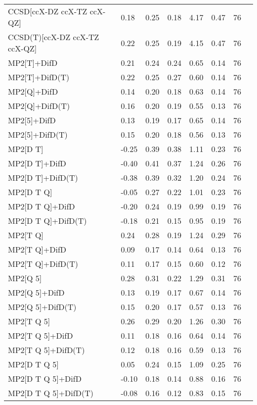 \begin{table}
\begin{tabular}{l l l l l l l l }
    CCSD[ccX-DZ ccX-TZ ccX-QZ] & 0.18 & 0.25 & 0.18 & 4.17 & 0.47 & 76 \\ 
    CCSD(T)[ccX-DZ ccX-TZ ccX-QZ] & 0.22 & 0.25 & 0.19 & 4.15 & 0.47 & 76 \\ 
    MP2[T]+DifD & 0.21 & 0.24 & 0.24 & 0.65 & 0.14 & 76 \\ 
    MP2[T]+DifD(T) & 0.22 & 0.25 & 0.27 & 0.60 & 0.14 & 76 \\ 
    MP2[Q]+DifD & 0.14 & 0.20 & 0.18 & 0.63 & 0.14 & 76 \\ 
    MP2[Q]+DifD(T) & 0.16 & 0.20 & 0.19 & 0.55 & 0.13 & 76 \\ 
    MP2[5]+DifD & 0.13 & 0.19 & 0.17 & 0.65 & 0.14 & 76 \\ 
    MP2[5]+DifD(T) & 0.15 & 0.20 & 0.18 & 0.56 & 0.13 & 76 \\ 
    MP2[D T] & -0.25 & 0.39 & 0.38 & 1.11 & 0.23 & 76 \\ 
    MP2[D T]+DifD & -0.40 & 0.41 & 0.37 & 1.24 & 0.26 & 76 \\ 
    MP2[D T]+DifD(T) & -0.38 & 0.39 & 0.32 & 1.20 & 0.24 & 76 \\ 
    MP2[D T Q] & -0.05 & 0.27 & 0.22 & 1.01 & 0.23 & 76 \\ 
    MP2[D T Q]+DifD & -0.20 & 0.24 & 0.19 & 0.99 & 0.19 & 76 \\ 
    MP2[D T Q]+DifD(T) & -0.18 & 0.21 & 0.15 & 0.95 & 0.19 & 76 \\ 
    MP2[T Q] & 0.24 & 0.28 & 0.19 & 1.24 & 0.29 & 76 \\ 
    MP2[T Q]+DifD & 0.09 & 0.17 & 0.14 & 0.64 & 0.13 & 76 \\ 
    MP2[T Q]+DifD(T) & 0.11 & 0.17 & 0.15 & 0.60 & 0.12 & 76 \\ 
    MP2[Q 5] & 0.28 & 0.31 & 0.22 & 1.29 & 0.31 & 76 \\ 
    MP2[Q 5]+DifD & 0.13 & 0.19 & 0.17 & 0.67 & 0.14 & 76 \\ 
    MP2[Q 5]+DifD(T) & 0.15 & 0.20 & 0.17 & 0.57 & 0.13 & 76 \\ 
    MP2[T Q 5] & 0.26 & 0.29 & 0.20 & 1.26 & 0.30 & 76 \\ 
    MP2[T Q 5]+DifD & 0.11 & 0.18 & 0.16 & 0.64 & 0.14 & 76 \\ 
    MP2[T Q 5]+DifD(T) & 0.12 & 0.18 & 0.16 & 0.59 & 0.13 & 76 \\ 
    MP2[D T Q 5] & 0.05 & 0.24 & 0.15 & 1.09 & 0.25 & 76 \\ 
    MP2[D T Q 5]+DifD & -0.10 & 0.18 & 0.14 & 0.88 & 0.16 & 76 \\ 
    MP2[D T Q 5]+DifD(T) & -0.08 & 0.16 & 0.12 & 0.83 & 0.15 & 76 \\ 
    \bottomrule
  \end{tabular}
\end{table}
